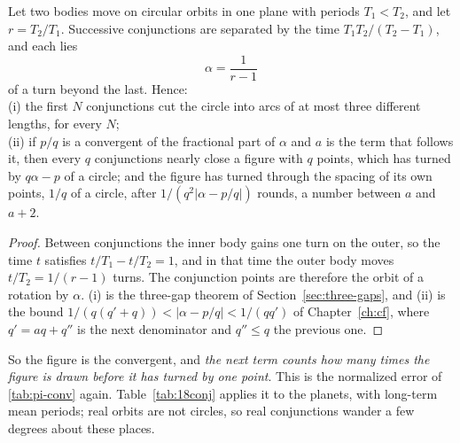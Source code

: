 \begin{proposition}\label{prop:18conj}
Let two bodies move on circular orbits in one plane with periods $T_1<T_2$, and let $r=T_2/T_1$.
Successive conjunctions are separated by the time $T_1T_2/(T_2-T_1)$, and each lies
\[
  \alpha=\frac{1}{r-1}
\]
of a turn beyond the last. Hence:\\
(i) the first $N$ conjunctions cut the circle into arcs of at most three different lengths, for every
$N$;\\
(ii) if $p/q$ is a convergent of the fractional part of $\alpha$ and $a$ is the term that follows it, then
every $q$ conjunctions nearly close a figure with $q$ points, which has turned by $q\alpha-p$ of a circle;
and the figure has turned through the spacing of its own points, $1/q$ of a circle, after
$1/(q^{2}|\alpha-p/q|)$ rounds, a number between $a$ and $a+2$.
\end{proposition}

\begin{proof}
Between conjunctions the inner body gains one turn on the outer, so the time $t$ satisfies
$t/T_1-t/T_2=1$, and in that time the outer body moves $t/T_2=1/(r-1)$ turns. The conjunction points are
therefore the orbit of a rotation by $\alpha$. (i) is the three-gap theorem of Section~\ref{sec:three-gaps}, and (ii) is
the bound $1/(q(q'+q))<|\alpha-p/q|<1/(qq')$ of Chapter~\ref{ch:cf}, where $q'=aq+q''$ is the next denominator and
$q''\le q$ the previous one.
\end{proof}

So the figure is the convergent, and \emph{the next term counts how many times the figure is drawn before
it has turned by one point}. This is the normalized error of \cref{tab:pi-conv} again. Table~\ref{tab:18conj}
applies it to the planets, with long-term mean periods; real orbits are not circles, so real conjunctions wander a
few degrees about these places.

